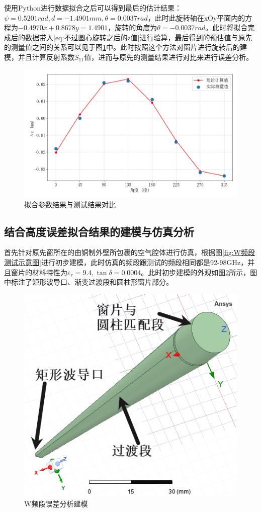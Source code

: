 \documentclass[master]{thesis-uestc}
\begin{document}
使用Python进行数据拟合之后可以得到最后的估计结果：\(\psi = 0.5201 rad, d = -1.4901 mm , \theta = 0.0037 rad\)，此时此旋转轴在xOy平面内的方程为\(-0.4970 x + 0.8678 y = 1.4901\)，旋转的角度为\(\theta = -0.0037 rad\)。此时将拟合完成后的数据带入\ref{eq:不过圆心旋转之后的z值}进行验算，最后得到的预估值与原先的测量值之间的关系可以见于图\ref{fig:测量z值与计算z值}中。此时按照这个方法对窗片进行旋转后的建模，并且计算反射系数\(S_{11}\)值，进而与原先的测量结果进行对比来进行误差分析。
\begin{figure}[!htb]
    \centering
    \includegraphics[width=0.35\linewidth]{pic/chapter5/不过圆心高度差拟合.png}
    \caption{拟合参数结果与测试结果对比}
    \label{fig:测量z值与计算z值}
\end{figure}

\subsection{结合高度误差拟合结果的建模与仿真分析}
首先针对原先窗所在的由铜制外壁所包裹的空气腔体进行仿真，根据图\ref{fig:W频段测试示意图}进行初步建模，此时仿真的频段跟测试的频段相同都是92-98GHz，并且窗片的材料特性为\(\varepsilon_r = 9.4, \tan \delta = 0.0004\)。此时初步建模的外观如图\ref{fig:W波段误差分析建模}所示，图中标注了矩形波导口、渐变过渡段和圆柱形窗片部分。
\begin{figure}[!htb]
    \centering
    \includegraphics[width=0.25\linewidth]{pic/chapter5/W频段误差分析建模.png}
    \caption{W频段误差分析建模}
    \label{fig:W波段误差分析建模}
\end{figure}
\end{document}
